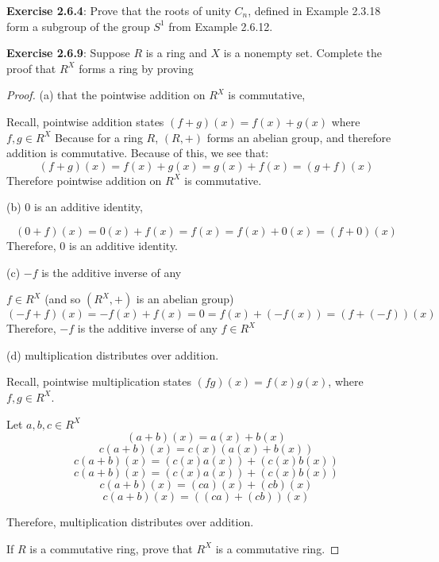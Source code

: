 \documentclass[a4paper]{article}
\begin{document}
\begin{myparindent}{0pt}
\textbf{Exercise 2.6.4}:
Prove that the roots of unity $C_n$, defined in Example 2.3.18 form a subgroup
of the group $S^1$ from Example 2.6.12. \newline

\textbf{Exercise 2.6.9}:
Suppose $R$  is a ring and $X$ is a nonempty set. Complete the proof that $R^X$
forms a ring by proving

\begin{proof}
(a) that the pointwise addition on $R^X$ is commutative, \newline

  Recall, pointwise addition states $(f + g)(x) = f(x) + g(x)$ where $f, g \in R^X$
  Because for a ring $R$, $(R, +)$ forms an abelian group, and therefore addition
  is commutative. Because of this, we see that:
  \[ (f + g)(x) = f(x) + g(x) = g(x) + f(x) = (g + f)(x) \]
  Therefore pointwise addition on $R^X$ is commutative. \newline

(b) 0 is an additive identity,

  \[ (0 + f)(x) = 0(x) + f(x) = f(x) = f(x) + 0(x) = (f + 0)(x) \]
  Therefore, $0$ is an additive identity. \newline

(c) $-f$ is the additive inverse of any \newline

$f \in R^X$ (and so $(R^X, +)$ is an abelian group)
  \[ (-f + f)(x) = -f(x) + f(x) = 0 = f(x) + (-f(x)) = (f + (-f))(x) \]
  Therefore, $-f$ is the additive inverse of any $f \in R^X$ \newline

(d) multiplication distributes over addition. \newline

  Recall, pointwise multiplication states $(fg)(x) = f(x)g(x)$, where $f, g \in R^X$.
  \newline

  Let $a, b, c \in R^X$
  \[ (a + b)(x) = a(x) + b(x) \]
  \[ c(a + b)(x) = c(x) (a(x) + b(x)) \]
  \[ c(a + b)(x) = (c(x) a(x)) + (c(x) b(x)) \]
  \[ c(a + b)(x) = (c(x) a(x)) + (c(x) b(x)) \]
  \[ c(a + b)(x) = (ca)(x) + (cb)(x) \]
  \[ c(a + b)(x) = ((ca) + (cb))(x) \]

  Therefore, multiplication distributes over addition. \newline

If $R$ is a commutative ring, prove that $R^X$ is a commutative ring. \newline


\end{proof}
\end{myparindent}
\end{document}
